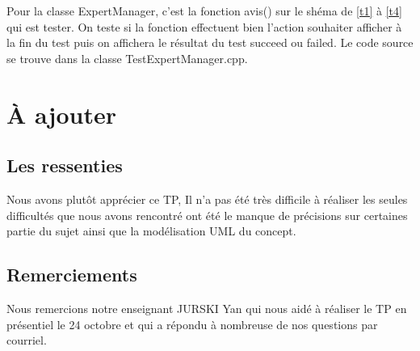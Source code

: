\documentclass[paper=a4, fontsize=11pt, frenchb, englishb]{article}
\begin{document}
\noindent Pour la classe ExpertManager,  c'est la fonction avis() sur le shéma de \ref{t1} à \ref{t4}  qui est tester. On teste si la fonction effectuent bien l'action souhaiter afficher à la fin du test puis on affichera le résultat du test succeed ou failed. Le code source se trouve dans la classe TestExpertManager.cpp.
	
	\section{À ajouter}
	
		\subsection{Les ressenties}
		
Nous avons plutôt apprécier ce TP, Il n'a pas été très difficile à réaliser les seules difficultés que nous avons rencontré ont été le manque de précisions sur certaines partie du sujet ainsi que la modélisation UML du concept.
		
		\subsection{Remerciements}
		
Nous remercions notre enseignant JURSKI Yan qui nous aidé à réaliser le TP en présentiel le 24 octobre et qui a répondu à nombreuse de nos questions par courriel.

\newpage
\listoffigures
	
\end{document}
